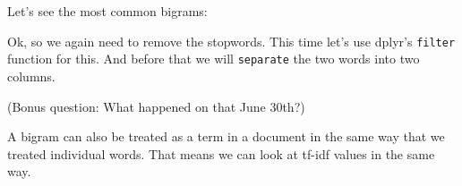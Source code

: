 \documentclass[]{book}
\newenvironment{Shaded}{\begin{snugshade}}{\end{snugshade}}
\newcommand{\CommentTok}[1]{\textcolor[rgb]{0.56,0.35,0.01}{\textit{#1}}}
\newcommand{\DataTypeTok}[1]{\textcolor[rgb]{0.13,0.29,0.53}{#1}}
\newcommand{\DecValTok}[1]{\textcolor[rgb]{0.00,0.00,0.81}{#1}}
\newcommand{\KeywordTok}[1]{\textcolor[rgb]{0.13,0.29,0.53}{\textbf{#1}}}
\newcommand{\NormalTok}[1]{#1}
\newcommand{\OperatorTok}[1]{\textcolor[rgb]{0.81,0.36,0.00}{\textbf{#1}}}
\newcommand{\OtherTok}[1]{\textcolor[rgb]{0.56,0.35,0.01}{#1}}
\newcommand{\StringTok}[1]{\textcolor[rgb]{0.31,0.60,0.02}{#1}}
\begin{document}
Let's see the most common bigrams:

\begin{Shaded}
\end{Shaded}

Ok, so we again need to remove the stopwords. This time let's use dplyr's \texttt{filter} function for this. And before that we will \texttt{separate} the two words into two columns.

\begin{Shaded}
\end{Shaded}

(Bonus question: What happened on that June 30th?)

A bigram can also be treated as a term in a document in the same way that we treated individual words. That means we can look at tf-idf values in the same way.
\end{document}
